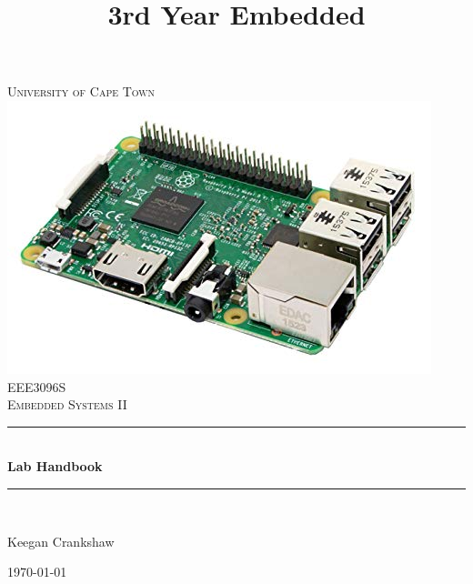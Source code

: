 \title{3rd Year Embedded}




\begin{titlepage}
	\centering
	\vspace*{0.5 cm}
	
	\textsc{\LARGE University of Cape Town}\\[2.0 cm]	%
	\includegraphics[scale = 0.5]{Figures/rpi.jpg}\\[1 cm]	%
	\textsc{\Large EEE3096S}\\[0.5 cm]				%
	\textsc{\large Embedded Systems II}\\[0.5 cm]				%
	\rule{\linewidth}{0.2 mm} \\[0.4 cm]
	{ \huge \bfseries Lab Handbook}\\
	\rule{\linewidth}{0.2 mm} \\[1.5 cm]
	
	\begin{center}
	    \large Keegan Crankshaw
	\end{center}
	
	{\large \today}\\[2 cm]
\end{titlepage}